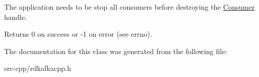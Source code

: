 The application needs to be stop all consumers before destroying the \hyperlink{classRdKafka_1_1Consumer}{Consumer} handle.

Returns 0 on success or -\/1 on error (see {\ttfamily errno}). 

The documentation for this class was generated from the following file\-:\begin{DoxyCompactItemize}
\item 
src-\/cpp/rdkafkacpp.\-h\end{DoxyCompactItemize}
